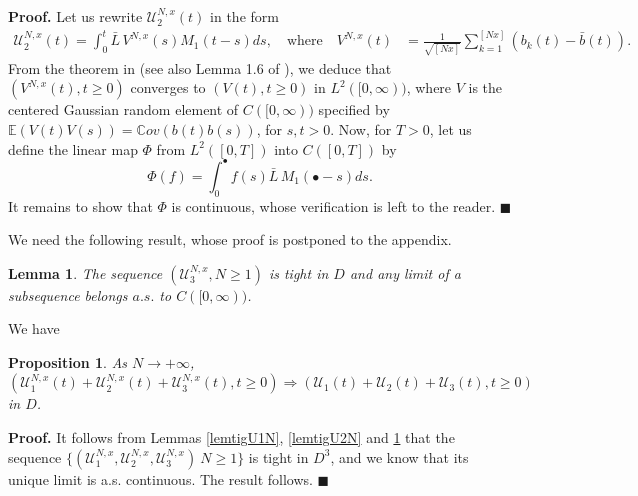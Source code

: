 \documentclass[11pt]{article}
\def\E{{\mathbb E}}
\def\L {\bar{L}}
\newtheorem{lemma}[theorem]{Lemma}
\newtheorem{proposition}[theorem]{Proposition}
\newenvironment{proof}[1][Proof.]{\textbf{#1} }{\hfill $\blacksquare$}
\begin{document}
\begin{proof}
Let us rewrite $\mathcal{U}_2^{N,x}(t)$ in the form 
 \begin{align*}
\mathcal{U}_2^{N,x}(t)= \int_0^t \L\, V^{N,x}(s) M_1(t-s)ds,\quad \mbox{where} \quad V^{N,x}(t)&=  \frac{1}{\sqrt{[Nx]}} \sum_{k=1}^{[Nx]} \left(b_k(t) - \bar{b}(t)\right).
\end{align*}
From the theorem in \cite{KNSV}  (see also Lemma 1.6 of \cite{PRY}), we deduce that $(V^{N,x}(t), t\ge 0)$ converges to $(V(t), t\ge 0)$ in $L^2([0,\infty))$, where $V$ is the centered Gaussian random element of $C([0,\infty))$ specified by $\E(V(t)V(s))=\mathbb{C}ov(b(t)b(s))$, for $s,t>0$. Now, for $T>0$, let us define the linear map $\Phi$ from $L^2([0,T])$ into $C([0,T])$ by
 \begin{equation*}
 \Phi(f)=\int_0^{\bullet} f(s) \L\, M_1(\bullet- s)ds.
 \end{equation*} 
It remains to show that $\Phi$ is continuous, whose verification is left to the reader. 
 \end{proof}
 
 We need the following result, whose proof is postponed to the appendix. 
 \begin{lemma}\label{lemtigU3N}
The sequence $(\mathcal{U}_3^{N,x}, N\ge 1)$ is tight in $D$ and any limit of a subsequence belongs $a.s.$ to $C([0,\infty))$.
\end{lemma}

 
 
 We have
 \begin{proposition}\label{somdesUN}
As $N\rightarrow +\infty$, $ (\mathcal{U}_1^{N,x}(t)+ \mathcal{U}_2^{N,x}(t)+ \mathcal{U}_3^{N,x}(t), t\ge 0) \Longrightarrow (\mathcal{U}_1(t)+ \mathcal{U}_2(t)+ \mathcal{U}_3(t), t\ge 0)$ in $D$.
\end{proposition}
 \begin{proof}
 It follows from Lemmas \ref{lemtigU1N}, \ref{lemtigU2N} and \ref{lemtigU3N} that the sequence 
 $\{(\mathcal{U}_1^{N,x},\mathcal{U}_2^{N,x},\mathcal{U}_3^{N,x})\ N\ge1\}$ is tight in $D^3$, and we know that its unique limit is a.s. continuous. The result follows.
 \end{proof}
\end{document}
